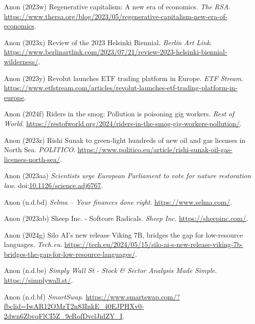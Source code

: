 \documentclass[
  letterpaper,
  DIV=11,
  numbers=noendperiod]{scrartcl}
\newlength{\cslhangindent}
\newenvironment{CSLReferences}[2] %
 {\begin{list}{}{%
  \setlength{\itemindent}{0pt}
  \setlength{\leftmargin}{0pt}
  \setlength{\parsep}{0pt}
  \ifodd #1
   \setlength{\leftmargin}{\cslhangindent}
   \setlength{\itemindent}{-1\cslhangindent}
  \fi
  \setlength{\itemsep}{#2\baselineskip}}}
 {\end{list}}
\begin{document}
\begin{CSLReferences}{0}{1}
Anon (2023w) Regenerative capitalism: A new era of economics. \emph{The
RSA}.
\url{https://www.thersa.org/blog/2023/05/regenerative-capitalism-new-era-of-economics}.

Anon (2023x) Review of the 2023 {Helsinki Biennial}. \emph{Berlin Art
Link}.
\url{https://www.berlinartlink.com/2023/07/21/review-2023-helsinki-biennial-wilderness/}.

Anon (2023y) Revolut launches {ETF} trading platform in {Europe}.
\emph{ETF Stream}.
\url{https://www.etfstream.com/articles/revolut-launches-etf-trading-platform-in-europe}.

Anon (2024f) Riders in the smog: {Pollution} is poisoning gig workers.
\emph{Rest of World}.
\url{https://restofworld.org/2024/riders-in-the-smog-gig-workers-pollution/}.

Anon (2023z) Rishi {Sunak} to green-light hundreds of new oil and gas
licenses in {North Sea}. \emph{POLITICO}.
\url{https://www.politico.eu/article/rishi-sunak-oil-gas-licenses-north-sea/}.

Anon (2023aa) \emph{Scientists urge {European Parliament} to vote for
nature restoration law}.
doi:\href{https://doi.org/10.1126/science.adj6767}{10.1126/science.adj6767}.

Anon (n.d.bd) \emph{Selma -- {Your} finances done right}.
\url{https://www.selma.com/}.

Anon (2023ab) Sheep {Inc}. - {Softcore Radicals}. \emph{Sheep Inc}.
\url{https://sheepinc.com/}.

Anon (2024g) Silo {AI}'s new release {Viking 7B}, bridges the gap for
low-resource languages. \emph{Tech.eu}.
\url{https://tech.eu/2024/05/15/silo-ai-s-new-release-viking-7b-bridges-the-gap-for-low-resource-languages/}.

Anon (n.d.be) \emph{Simply {Wall St} - {Stock} \& {Sector Analysis Made
Simple}}. \url{https://simplywall.st/}.

Anon (n.d.bf) \emph{{SmartSwap}}.
\url{https://www.smartswap.com/?fbclid=IwAR12OMzT2n83InkE_40EJPHXv0-2dwn6ZbvqFlCI5Z_9eRofDvclJidZY_I}.


\end{CSLReferences}
\end{document}
